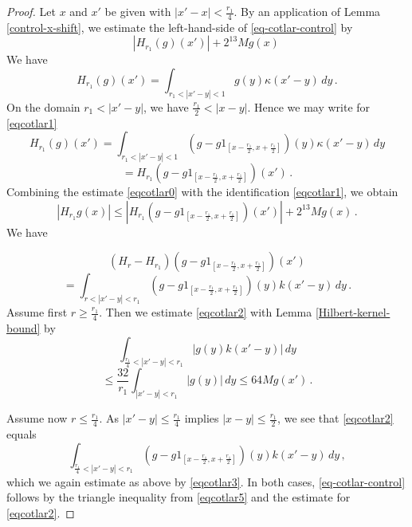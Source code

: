 {\begin{proof}
Let $x$ and $x'$ be given with $|x'-x|<\frac {r_1}4$.
By an application of Lemma \ref{control-x-shift}, we estimate
the left-hand-side of
\eqref{eq-cotlar-control} by
\begin{equation}\label{eqcotlar0}
|H_{r_1}(g)(x')|+
2^{13}Mg(x)\,
\end{equation}
We  have
\begin{equation*}
H_{r_1}(g)(x')=
\int_{r_1<|x'-y|<1} g(y) \kappa(x'-y)\, dy\, .
\end{equation*}
On the domain $r_1<|x'-y|$, we have $\frac {r_1}2<|x-y|$. Hence we may write
for \eqref{eqcotlar1}
\begin{equation*}
H_{r_1}(g)(x')=\int_{r_1<|x'-y|<1} (g-g1_{[x-\frac {r_1} 2,x+\frac {r_1}2]})(y) \kappa(x'-y)\, dy
\end{equation*}
\begin{equation}\label{eqcotlar1}
=H_{r_1}(g-g1_{[x-\frac {r_1} 2,x+\frac {r_1}2]})(x')\, .
\end{equation}
Combining the estimate  \eqref{eqcotlar0} with the identification \eqref{eqcotlar1}, we obtain
\begin{equation}\label{eqcotlar5}
\left|H_{r_1} g(x)
\right|\le
|H_{r_1}(g-g1_{[x-\frac {r_1} 2,x+\frac {r_1}2]})(x')|+
2^{13}Mg(x)\, .
\end{equation}
We  have

\begin{equation*}
(H_{r}-H_{r_1})(g-g1_{[x-\frac {r_1} 2,x+\frac {r_1}2]})(x')
\end{equation*}
\begin{equation}\label{eqcotlar2}
= \int_{ {r}<|x'-y|<r_1}
(g-g1_{[x-\frac {r_1} 2,x+\frac {r_1}2]})(y)k(x'-y)\, dy\,  .
\end{equation}
Assume first $r\ge \frac {r_1} 4$.
Then we estimate \eqref{eqcotlar2} with
Lemma \ref{Hilbert-kernel-bound} by
\begin{equation*}
\int_{\frac {r_1}4<|x'-y|<r_1}
|g(y)k(x'-y)|\, dy
\end{equation*}
\begin{equation}\label{eqcotlar3}
\le \frac {32}{r_1}\int_{|x'-y|<r_1}
|g(y)|\, dy \le 64 Mg(x')\,  .
\end{equation}

Assume now $r\le \frac {r_1} 4$.
As $|x'-y|\le \frac{r_1}4$ implies
$|x-y|\le \frac {r_1} 2$, we see that
\eqref{eqcotlar2} equals
\begin{equation*}
 \int_{ {\frac {r_1} 4}<|x'-y|<r_1}
(g-g1_{[x-\frac {r_1} 2,x+\frac {r_1}2]})(y)k(x'-y)\, dy\,  ,
\end{equation*}
which we again estimate as above by \eqref{eqcotlar3}.
In both cases, \eqref{eq-cotlar-control} follows by the triangle inequality from \eqref{eqcotlar5}  and the estimate for
\eqref{eqcotlar2}.
\end{proof}

}

